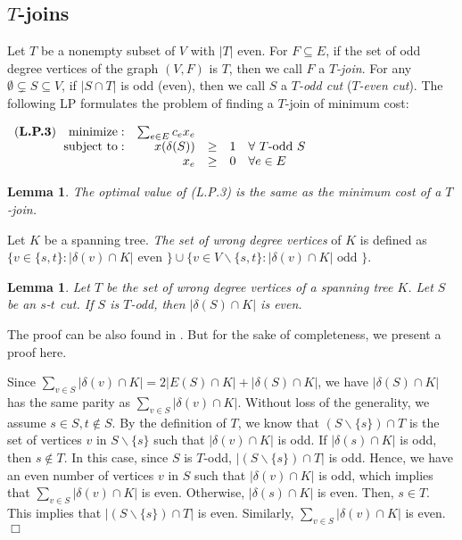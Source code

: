 \documentclass[11pt]{article}
\newcommand{\qed}{\hspace*{\fill}$\Box$}
\newtheorem{lemma}[theorem]{Lemma}
\newenvironment{proof}[1][Proof. ]{\noindent {\bf #1 }}{\qed}
\begin{document}
\subsection{$T$-joins}

Let $T$ be a nonempty subset of $V$ with $|T|$ even.
For $F\subseteq E$, if the set of odd degree vertices of
the graph $(V, F)$ is $T$, then we call $F$ a \emph{$T$-join}.
For any $\emptyset \subsetneq S\subseteq V$, if $|S\cap T|$ is odd (even),
then we call $S$ a \emph{$T$-odd cut} (\emph{$T$-even cut}).
The following LP formulates the problem of
finding a $T$-join of minimum cost:
\medskip

$
\begin{array}{rrcll}
\hbox{({\bf L.P.3})}\quad  {\rm minimize} : & \sum_{e \in E} c_ex_e & & \\
{\rm subject~to} : & x(\delta(S)) & \geq & 1 & \forall \mbox{ $T$-odd } S \\
& x_e & \geq & 0 & \forall e \in E
\end{array}
$
\begin{lemma}\cite{EJ01}\label{lem:Tjoin}
The optimal value of (L.P.3) is the same as the minimum cost of a $T$-join.
\end{lemma}

Let $K$ be a spanning tree. \emph{The set of wrong degree vertices} of $K$ is defined as $\{v\in \{s, t\}: |\delta(v)\cap K| \mbox{ even }\} \cup
\{v\in V\backslash \{s, t\} : |\delta(v)\cap K| \mbox{ odd }\}$.
\begin{lemma}\cite{AKS12}\label{lem:simpleParity}
Let $T$ be the set of wrong degree vertices of a spanning tree $K$. Let $S$ be an $s$-$t$ cut. If $S$ is $T$-odd, then $|\delta(S)\cap K|$ is even.
\end{lemma}

The proof can be also found in \cite[Lemma 2.1]{CFG12}. But for the sake of completeness, we present a proof here.

\vspace{3mm}

\begin{proof}
Since $\sum_{v\in S}|\delta(v)\cap K|=2|E(S)\cap K| + |\delta(S)\cap K|$, we have $|\delta(S)\cap K|$ has the same parity as $\sum_{v\in S}|\delta(v)\cap K|$. Without loss of the generality, we assume $s\in S, t\notin S$. By the definition of $T$, we know that $(S\backslash \{s\})\cap T$ is the set of vertices $v$ in $S\backslash \{s\}$ such that $|\delta(v)\cap K|$ is odd. If $|\delta(s)\cap K|$ is odd, then $s\notin T$. In this case, since $S$ is $T$-odd, $|(S\backslash \{s\})\cap T|$ is odd.  Hence, we have an even number of vertices $v$ in $S$ such that $|\delta(v)\cap K|$ is odd, which implies that $\sum_{v\in S}|\delta(v)\cap K|$ is even. Otherwise, $|\delta(s)\cap K|$ is even. Then, $s\in T$. This implies that $|(S\backslash \{s\})\cap T|$ is even. Similarly, $\sum_{v\in S}|\delta(v)\cap K|$ is even.
\end{proof}
\end{document}
